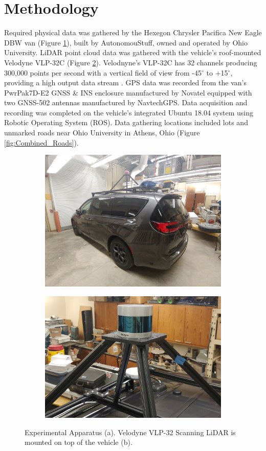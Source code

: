 \documentclass[journal,onecolumn]{IEEEtran}
\begin{document}
{\section{Methodology}

	Required physical data was gathered by the Hexegon Chrysler Pacifica New Eagle DBW van (Figure \ref{fig:van}), built by AutonomouStuff, owned and operated by Ohio University. LiDAR point cloud data was gathered with the vehicle's roof-mounted Velodyne VLP-32C (Figure \ref{fig:vlp32mount}). Velodnyne's VLP-32C has 32 channels producing 300,000 points per second with a vertical field of view from -45$^{\circ}$ to $+$15$^{\circ}$, providing a high output data stream \cite{vlp_32c}. GPS data was recorded from the van's PwrPak7D-E2 GNSS \& INS enclosure manufactured by Novatel equipped with two GNSS-502 antennas manufactured by NavtechGPS. Data acquisition and recording was completed on the vehicle's integrated Ubuntu 18.04 system using Robotic Operating System (ROS). Data gathering locations included lots and unmarked roads near Ohio University in Athens, Ohio (Figure \ref{fig:Combined_Roads}).
	
	\begin{figure}[H] 
		\centering
		\begin{subfigure}{0.45\textwidth}
			\centering
			\includegraphics[width=0.9\linewidth,height=4.60 cm,keepaspectratio]{figures/Van}
			\caption[Sensor Van]{}
			\label{fig:van}
		\end{subfigure}
		\begin{subfigure}{0.45\textwidth}
			\centering
			\includegraphics[width=0.9\linewidth,height=4.60 cm,keepaspectratio]{figures/vlp_32_mount_2}
			\caption[VLP 32 on Van]{}
			\label{fig:vlp32mount}
		\end{subfigure}
		\caption[Experimental Apparatus]{Experimental Apparatus (a). Velodyne VLP-32 Scanning LiDAR is mounted on top of the vehicle (b).}
		\label{fig:Experimental_Apperatus}
	\end{figure}

}
\end{document}
